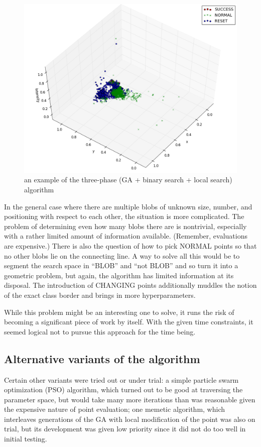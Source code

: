\documentclass[times, utf8, diplomski]{fer}
\begin{document}
\begin{figure}[htbp]
    \centering
    \includegraphics[width=\textwidth]{images/GA-binary-local.png}
    \caption{an example of the three-phase (GA + binary search + local search)
             algorithm
    }
    \label{fig:three-phase-example}
\end{figure}


In the general case where there are multiple blobs of unknown size, number,
and positioning with respect to each other, the situation is more complicated.
The problem of determining even how many blobs there are is nontrivial,
especially with a rather limited amount of information available. (Remember,
evaluations are expensive.) There is also the question of how to pick NORMAL
points so that no other blobs lie on the connecting line. A way to solve all
this would be to segment the search space in ``BLOB'' and ``not BLOB'' and so turn
it into a geometric problem, but again, the algorithm has limited information
at its disposal. The introduction of CHANGING points additionally muddles the
notion of the exact class border and brings in more hyperparameters. 

While this problem might be an interesting one to solve, it runs the risk of
becoming a significant piece of work by itself. With the given time constraints,
it seemed logical not to pursue this approach for the time being.


\subsection{Alternative variants of the algorithm}
Certain other variants were tried out or under trial: a simple particle swarm
optimization (PSO) algorithm, which turned out to be good at traversing the
parameter space, but would take many more iterations than was reasonable given
the expensive nature of point evaluation; one memetic algorithm, which interleaves
generations of the GA with local modification of the point was also on trial, but
its development was given low priority since it did not do too well in initial
testing.
\end{document}
